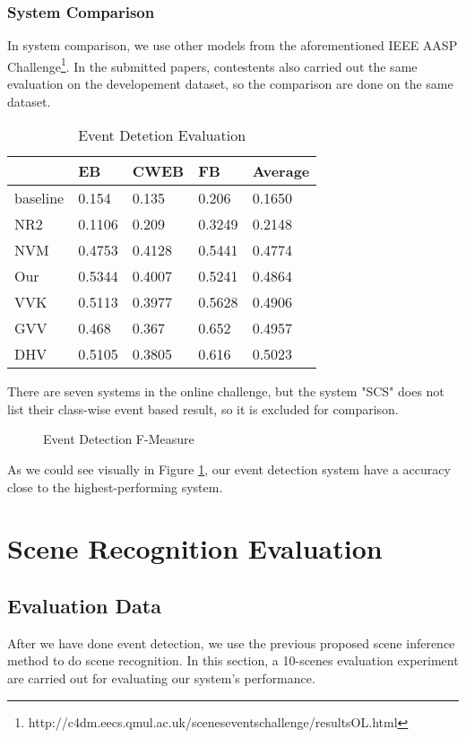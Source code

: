 \subsubsection{System Comparison}
In system comparison, we use other models from the aforementioned IEEE AASP Challenge\footnote{http://c4dm.eecs.qmul.ac.uk/sceneseventschallenge/resultsOL.html}. 
In the submitted papers, contestents also carried out the same evaluation on the developement dataset, so the comparison are done on the same dataset.  
\begin{table}[htb]
\centering
\caption{Event Detetion Evaluation}
\begin{tabular}{lllll}
\hline
         & EB    & CWEB  & FB    & Average \\
\hline
baseline & 0.154  & 0.135  & 0.206  & 0.1650   \\
NR2      & 0.1106 & 0.209  & 0.3249 & 0.2148   \\
NVM      & 0.4753 & 0.4128 & 0.5441 & 0.4774   \\
Our      & 0.5344 & 0.4007 & 0.5241 & 0.4864   \\
VVK      & 0.5113 & 0.3977 & 0.5628 & 0.4906   \\
GVV      & 0.468  & 0.367  & 0.652  & 0.4957   \\
DHV      & 0.5105 & 0.3805 & 0.616  & 0.5023   \\     
\hline
\end{tabular}
\end{table}
There are seven systems in the online challenge, but the system "SCS" does not list their class-wise event based result, so it is excluded for comparison. 
\begin{figure}[htb!]
\centering

\caption{Event Detection F-Measure}
\label{fig:eventdetectF1}
\end{figure}
As we could see visually in Figure \ref{fig:eventdetectF1}, our event detection system have a accuracy close to the highest-performing system. 


\section{Scene Recognition Evaluation}

\subsection{Evaluation Data}
After we have done event detection, we use the previous proposed scene inference method to do scene recognition. 
In this section, a 10-scenes evaluation experiment are carried out for evaluating our system's performance.

